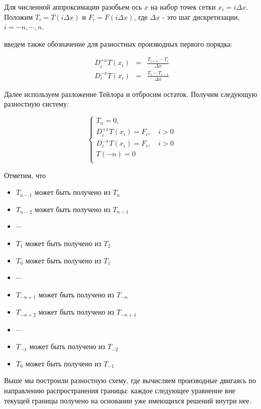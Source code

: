 Для численной аппроксимации разобьем ось $x$ на набор точек сетки
$x_i=i\Delta x$. Положим $T_i = T(i \Delta x)$ и $F_i = F(i \Delta
x)$, где $\Delta x$ - это шаг дискретизации, $i = -n, \cdots,
n$. 

введем также обозначение для разностных производных первого порядка:

\begin{eqnarray*}
    D^{+x}_iT(x_i) &=& \frac{T_{i+1} - T_{i}}{\Delta x} \\
    D^{-x}_iT(x_i) &=& \frac{T_{i} - T_{i-1}}{\Delta x}
\end{eqnarray*}

Далее используем разложение Тейлора и отбросим остаток. Получим
следующую разностную систему:

\begin{equation}
  \label{eq:discretise}
  \begin{cases}
      T_n = 0,\\
      D^{+x}_iT(x_i) = F_i, \quad i>0 \\
      D^{-x}_iT(x_i)  = F_i, \quad i>0\\
      T(-n) = 0\\
    \end{cases}
\end{equation}

Отметим, что
\begin{itemize}
\item[ ] $T_{n-1}$ может быть получено из $T_n$
\item[ ] $T_{n-2}$ может быть получено из $T_{n-1}$
\item[ ]  $\cdots$
\item[ ] $T_{1}$ может быть получено из $T_2$
\item[ ] $T_{0}$ может быть получено из $T_{1}$
\item[ ]  $\cdots$
\item[ ] $T_{-n+1}$ может быть получено из $T_{-n}$
\item[ ] $T_{-n+2}$ может быть получено из $T_{-n+1}$
\item[ ]  $\cdots$
\item[ ] $T_{-1}$ может быть получено из $T_{-2}$
\item[ ] $T_{0}$ может быть получено из $T_{-1}$

\end{itemize}

Выше мы построили разностную схему, где вычисляем производные двигаясь
по направлению распространения границы: каждое следующее уравнение вне
текущей границы получено на основании уже имеющихся решений внутри
нее.

